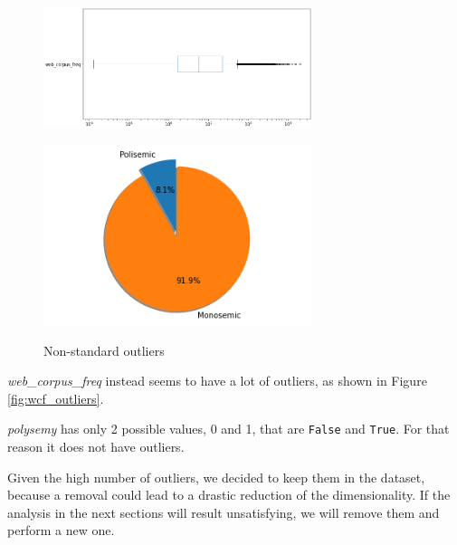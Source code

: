 \documentclass[a4paper,11pt,dvipsnames]{article}
\begin{document}
\begin{figure}[h]
\begin{minipage}[b]{.58\linewidth}
    \centering
    \includegraphics[width=0.7\textwidth]{Graphs/wcf_outliers.png}
    \label{fig:wcf_outliers}
    \end{minipage}\hfill
    \begin{minipage}[b]{.38\linewidth}
    \centering
    \includegraphics[width=0.7\textwidth]{Graphs/piechart.png}
    \label{fig:pie}
    \end{minipage}
    \caption{Non-standard outliers}
    
\end{figure}

\textit{web\_corpus\_freq} instead seems to have a lot of outliers, as shown in Figure \ref{fig:wcf_outliers}.

\textit{polysemy} has only 2 possible values, 0 and 1, that are \texttt{False} and \texttt{True}. For that reason it does not have outliers. 

Given the high number of outliers, we decided to keep them in the dataset, because a removal could lead to a drastic reduction of the dimensionality. 
If the analysis in the next sections will result unsatisfying, we will remove them and perform a new one. 

\end{document}
